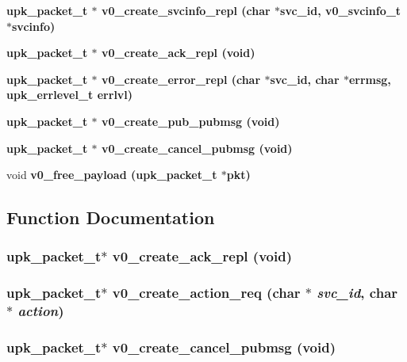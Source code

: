 \begin{CompactItemize}
\bf{upk\_\-packet\_\-t} $\ast$ \bf{v0\_\-create\_\-svcinfo\_\-repl} (char $\ast$svc\_\-id, \bf{v0\_\-svcinfo\_\-t} $\ast$svcinfo)
\item 
\bf{upk\_\-packet\_\-t} $\ast$ \bf{v0\_\-create\_\-ack\_\-repl} (void)
\item 
\bf{upk\_\-packet\_\-t} $\ast$ \bf{v0\_\-create\_\-error\_\-repl} (char $\ast$svc\_\-id, char $\ast$errmsg, \bf{upk\_\-errlevel\_\-t} errlvl)
\item 
\bf{upk\_\-packet\_\-t} $\ast$ \bf{v0\_\-create\_\-pub\_\-pubmsg} (void)
\item 
\bf{upk\_\-packet\_\-t} $\ast$ \bf{v0\_\-create\_\-cancel\_\-pubmsg} (void)
\item 
void \bf{v0\_\-free\_\-payload} (\bf{upk\_\-packet\_\-t} $\ast$pkt)
\end{CompactItemize}


\subsection{Function Documentation}
\subsubsection{\setlength{\rightskip}{0pt plus 5cm}\bf{upk\_\-packet\_\-t}$\ast$ v0\_\-create\_\-ack\_\-repl (void)}\label{v0__protocol_8h_5ea3fb24528535a2a08943f7dcce85bc}


\subsubsection{\setlength{\rightskip}{0pt plus 5cm}\bf{upk\_\-packet\_\-t}$\ast$ v0\_\-create\_\-action\_\-req (char $\ast$ {\em svc\_\-id}, char $\ast$ {\em action})}\label{v0__protocol_8h_ac4eef1f8bc3804cd3e76d40d4b84ae6}


\subsubsection{\setlength{\rightskip}{0pt plus 5cm}\bf{upk\_\-packet\_\-t}$\ast$ v0\_\-create\_\-cancel\_\-pubmsg (void)}\label{v0__protocol_8h_0391f0ee6032ec320ebd72df6e478c80}


